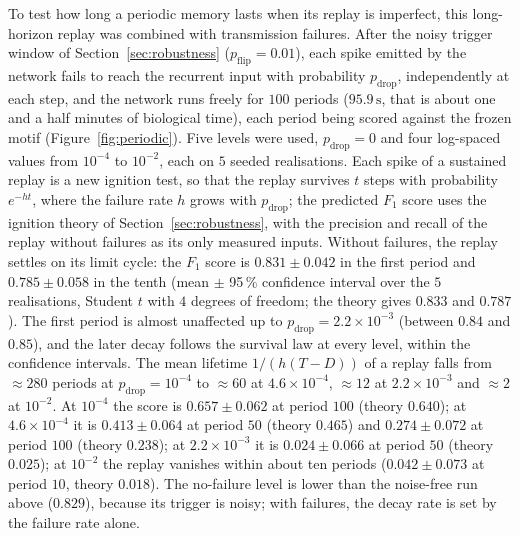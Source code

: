 \documentclass{scrartcl}
\begin{document}
To test how long a periodic memory lasts when its replay is imperfect, this long-horizon replay was combined with transmission failures. After the noisy trigger window of Section~\ref{sec:robustness} ($p_\mathrm{flip} = 0.01$), each spike emitted by the network fails to reach the recurrent input with probability $p_\mathrm{drop}$, independently at each step, and the network runs freely for $100$ periods ($95.9\,\mathrm{s}$, that is about one and a half minutes of biological time), each period being scored against the frozen motif (Figure~\ref{fig:periodic}). Five levels were used, $p_\mathrm{drop} = 0$ and four log-spaced values from $10^{-4}$ to $10^{-2}$, each on $5$ seeded realisations. Each spike of a sustained replay is a new ignition test, so that the replay survives $t$ steps with probability $e^{-ht}$, where the failure rate $h$ grows with $p_\mathrm{drop}$; the predicted $F_1$ score uses the ignition theory of Section~\ref{sec:robustness}, with the precision and recall of the replay without failures as its only measured inputs. Without failures, the replay settles on its limit cycle: the $F_1$ score is $0.831 \pm 0.042$ in the first period and $0.785 \pm 0.058$ in the tenth (mean $\pm$ 95\,\% confidence interval over the $5$ realisations, Student $t$ with $4$ degrees of freedom; the theory gives $0.833$ and $0.787$). The first period is almost unaffected up to $p_\mathrm{drop} = 2.2\times10^{-3}$ (between $0.84$ and $0.85$), and the later decay follows the survival law at every level, within the confidence intervals. The mean lifetime $1/(h(T-D))$ of a replay falls from $\approx 280$ periods at $p_\mathrm{drop} = 10^{-4}$ to $\approx 60$ at $4.6\times10^{-4}$, $\approx 12$ at $2.2\times10^{-3}$ and $\approx 2$ at $10^{-2}$. At $10^{-4}$ the score is $0.657 \pm 0.062$ at period $100$ (theory $0.640$); at $4.6\times10^{-4}$ it is $0.413 \pm 0.064$ at period $50$ (theory $0.465$) and $0.274 \pm 0.072$ at period $100$ (theory $0.238$); at $2.2\times10^{-3}$ it is $0.024 \pm 0.066$ at period $50$ (theory $0.025$); at $10^{-2}$ the replay vanishes within about ten periods ($0.042 \pm 0.073$ at period $10$, theory $0.018$). The no-failure level is lower than the noise-free run above ($0.829$), because its trigger is noisy; with failures, the decay rate is set by the failure rate alone.

%
\end{document}
